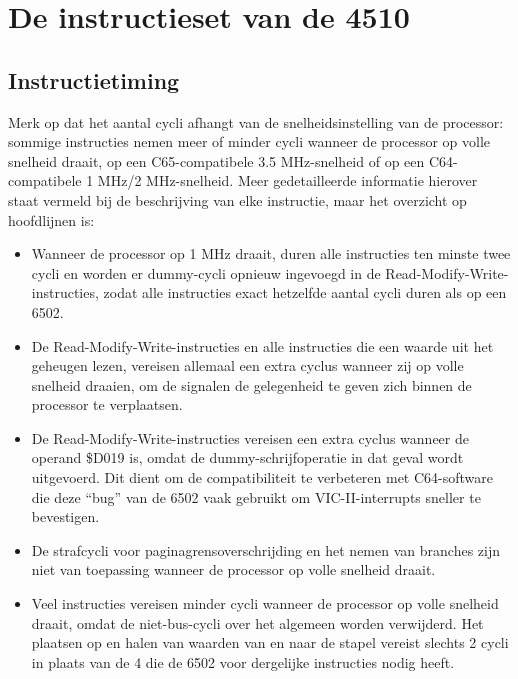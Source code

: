 



\clearpage
\section{De instructieset van de 4510}

\subsection{Instructietiming}

Merk op dat het aantal cycli afhangt van de snelheidsinstelling van de processor: sommige instructies nemen meer of minder cycli wanneer de processor op volle snelheid draait, op een C65-compatibele 3.5 MHz-snelheid of op een C64-compatibele 1 MHz/2 MHz-snelheid. Meer gedetailleerde informatie hierover staat vermeld bij de beschrijving van elke instructie, maar het overzicht op hoofdlijnen is:

\begin{itemize}
\item Wanneer de processor op 1 MHz draait, duren alle instructies ten minste twee cycli en worden er dummy-cycli opnieuw ingevoegd in de Read-Modify-Write-instructies, zodat alle instructies exact hetzelfde aantal cycli duren als op een 6502.
\item De Read-Modify-Write-instructies en alle instructies die een waarde uit het geheugen lezen, vereisen allemaal een extra cyclus wanneer zij op volle snelheid draaien, om de signalen de gelegenheid te geven zich binnen de processor te verplaatsen.
\item De Read-Modify-Write-instructies vereisen een extra cyclus wanneer de operand \$D019 is, omdat de dummy-schrijfoperatie in dat geval wordt uitgevoerd. Dit dient om de compatibiliteit te verbeteren met C64-software die deze ``bug'' van de 6502 vaak gebruikt om VIC-II-interrupts sneller te bevestigen.
\item De strafcycli voor paginagrensoverschrijding en het nemen van branches zijn niet van toepassing wanneer de processor op volle snelheid draait.\item Veel instructies vereisen minder cycli wanneer de processor op volle snelheid draait, omdat de niet-bus-cycli over het algemeen worden verwijderd. Het plaatsen op en halen van waarden van en naar de stapel vereist slechts 2 cycli in plaats van de 4 die de 6502 voor dergelijke instructies nodig heeft.
\end{itemize}

